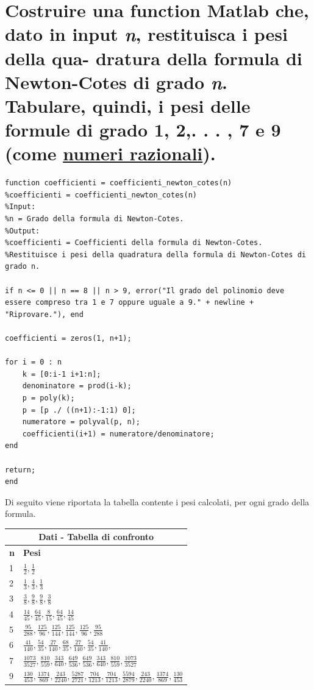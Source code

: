 \documentclass[10pt,a4paper]{article}
\begin{document}
\section{
  Costruire una function Matlab che, dato in input \textit{n}, restituisca i pesi della qua-
  dratura della formula di Newton-Cotes di grado \textit{n}. Tabulare, quindi, i pesi delle formule di grado
  1, 2,. . . , 7 e 9 (come \underline{numeri razionali}).
 }
\begin{lstlisting}[style=Matlab-editor]
function coefficienti = coefficienti_newton_cotes(n)
%coefficienti = coefficienti_newton_cotes(n)
%Input:
%n = Grado della formula di Newton-Cotes.
%Output:
%coefficienti = Coefficienti della formula di Newton-Cotes.
%Restituisce i pesi della quadratura della formula di Newton-Cotes di grado n.

if n <= 0 || n == 8 || n > 9, error("Il grado del polinomio deve essere compreso tra 1 e 7 oppure uguale a 9." + newline +  "Riprovare."), end

coefficienti = zeros(1, n+1);

for i = 0 : n
    k = [0:i-1 i+1:n];
    denominatore = prod(i-k);
    p = poly(k);
    p = [p ./ ((n+1):-1:1) 0];
    numeratore = polyval(p, n);
    coefficienti(i+1) = numeratore/denominatore;
end

return;
end
\end{lstlisting}

Di seguito viene riportata la tabella contente i pesi calcolati, per ogni grado della formula.
\\
\begin{center}
  \begin{spacing}{1.5}
  \begin{longtable}{ |p{0.2cm}|p{8cm}| }
    \hline
    \multicolumn{2}{|c|}{ \textbf{Dati - Tabella di confronto}} \\
    \hline
    \textbf{n}     & \textbf{Pesi} \\
    \hline
    1 & $ \frac{1}{2}, \frac{1}{2} $ \\
    2 & $ \frac{1}{3}, \frac{4}{3}, \frac{1}{3} $ \\
    3 & $ \frac{3}{8}, \frac{9}{8}, \frac{9}{8}, \frac{3}{8} $ \\
    4 & $ \frac{14}{45}, \frac{64}{45}, \frac{8}{15}, \frac{64}{45}, \frac{14}{45} $ \\
    5 & $ \frac{95}{288}, \frac{125}{96}, \frac{125}{144}, \frac{125}{144}, \frac{125}{96}, \frac{95}{288} $ \\
    6 & $ \frac{41}{140}, \frac{54}{35}, \frac{27}{140}, \frac{68}{35}, \frac{27}{140}, \frac{54}{35}, \frac{41}{140}, $ \\
    7 & $ \frac{1073}{3527}, \frac{810}{559}, \frac{343}{640}, \frac{649}{536}, \frac{649}{536}, \frac{343}{640}, \frac{810}{559}, \frac{1073}{3527} $ \\
    9 & $ \frac{130}{453}, \frac{1374}{869}, \frac{243}{2240}, \frac{5287}{2721}, \frac{704}{1213}, \frac{704}{1213}, \frac{5594}{2879}, \frac{243}{2240}, \frac{1374}{869}, \frac{130}{453} $ \\
    \hline
  \end{longtable}
\end{spacing}
\end{center}
\end{document}
